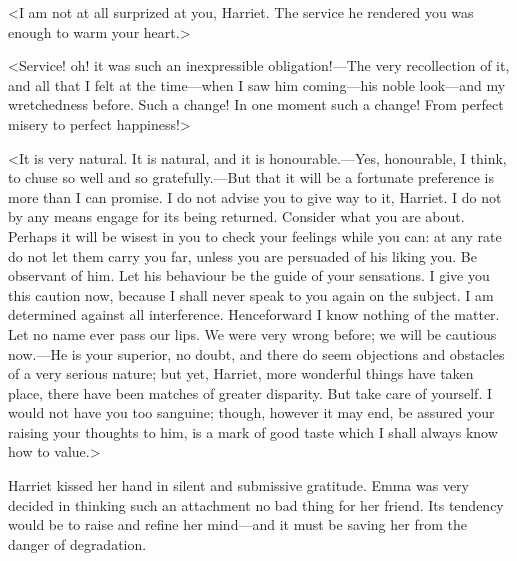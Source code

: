<I am not at all surprized at you, Harriet. The service he rendered you was enough to warm your heart.>

<Service! oh! it was such an inexpressible obligation!—The very recollection of it, and all that I felt at the time—when I saw him coming—his noble look—and my wretchedness before. Such a change! In one moment such a change! From perfect misery to perfect happiness!>

<It is very natural. It is natural, and it is honourable.—Yes, honourable, I think, to chuse so well and so gratefully.—But that it will be a fortunate preference is more than I can promise. I do not advise you to give way to it, Harriet. I do not by any means engage for its being returned. Consider what you are about. Perhaps it will be wisest in you to check your feelings while you can: at any rate do not let them carry you far, unless you are persuaded of his liking you. Be observant of him. Let his behaviour be the guide of your sensations. I give you this caution now, because I shall never speak to you again on the subject. I am determined against all interference. Henceforward I know nothing of the matter. Let no name ever pass our lips. We were very wrong before; we will be cautious now.—He is your superior, no doubt, and there do seem objections and obstacles of a very serious nature; but yet, Harriet, more wonderful things have taken place, there have been matches of greater disparity. But take care of yourself. I would not have you too sanguine; though, however it may end, be assured your raising your thoughts to him, is a mark of good taste which I shall always know how to value.>

Harriet kissed her hand in silent and submissive gratitude. Emma was very decided in thinking such an attachment no bad thing for her friend. Its tendency would be to raise and refine her mind—and it must be saving her from the danger of degradation.